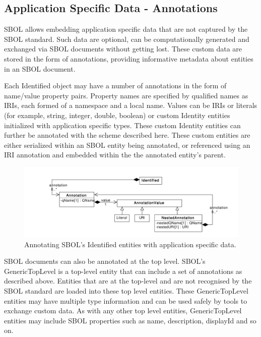 \documentclass[draftspec]{sbmlpkgspec}
\begin{document}
\subsection{Application Specific Data - Annotations}
SBOL allows embedding application specific data that are not captured by the SBOL standard. Such data are optional, can be computationally generated and exchanged via SBOL documents without getting lost. These custom data are stored in the form of annotations, providing informative metadata about entities in an SBOL document.

Each Identified object may have a number of annotations in the form of name/value property pairs. Property names are specified by qualified names as IRIs, each formed of a namespace and a local name. Values can be IRIs or literals (for example, string, integer, double, boolean) or custom Identity entities initialized with application specific types. These custom Identity entities can further be annotated with the scheme described here. These custom entities are either serialized within an SBOL entity being annotated, or referenced using an IRI annotation and embedded within the the annotated entity's parent. 

\begin{figure}[!ht]
\begin{center}
\includegraphics[scale=0.8]{uml/identified_annotations}
\caption[]{Annotating SBOL's Identified entities with application specific data.}
\label{uml:identified_annotations}
\end{center}
\end{figure}

SBOL documents can also be annotated at the top level. SBOL's GenericTopLevel is a top-level entity that can include a set of annotations as described above. Entities that are at the top-level and are not recognised by the SBOL standard are loaded into these top level entities. These GenericTopLevel entities may have multiple type information and can be used safely by tools to exchange custom data. As with any other top level entities, GenericTopLevel entities may include SBOL properties such as name, description, displayId and so on.
\end{document}

